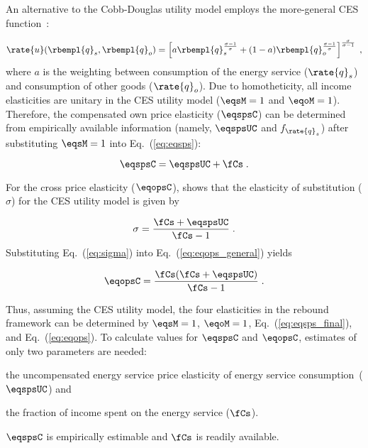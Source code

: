 An alternative to the Cobb-Douglas utility model employs 
the more-general CES function~\citep{Lemoine:2020aa}:

\begin{equation}
  \rate{u}(\rbempl{q}_s,\rbempl{q}_o) = 
      \left[ a \rbempl{q}_s^{\frac{\sigma-1}{\sigma}} 
            + (1-a) \rbempl{q}_o^{\frac{\sigma-1}{\sigma}} \right]                
                                   ^{\frac{\sigma}{\sigma-1}} \; ,
\end{equation}
%
where $a$ is the weighting between
consumption of the energy service ($\rate{q}_s$)
and consumption of other goods ($\rate{q}_o$).
Due to homotheticity,
all income elasticities are unitary in the CES utility model
($\eqsM = 1$ and $\eqoM = 1$).
Therefore,
the compensated own price elasticity ($\eqspsC$) can be
determined from empirically available information
(namely, $\eqspsUC$ and $f_{\rate{q}_s}$)
after substituting $\eqsM = 1$ into Eq.~(\ref{eq:eqsps}):

\begin{equation} \label{eq:eqsps_final}
  \eqspsC = \eqspsUC + \fCs \; .
\end{equation}

For the cross price elasticity ($\eqopsC$),
\citet{Gortz1977} shows that
the elasticity of substitution ($\sigma$)
for the CES utility model is given by

\begin{equation} \label{eq:sigma}
  \sigma  = \frac{\fCs + \eqspsUC}{\fCs - 1} \; . 
\end{equation}
%
Substituting Eq.~(\ref{eq:sigma}) into Eq.~(\ref{eq:eqops_general}) yields

\begin{equation} \label{eq:eqops}
  \eqopsC = \frac{\fCs (\fCs + \eqspsUC)}{\fCs - 1} \; .
\end{equation}

Thus, assuming the CES utility model,
the four elasticities in the rebound framework can be determined by
$\eqsM = 1$,
$\eqoM = 1$,
Eq.~(\ref{eq:eqsps_final}), and
Eq.~(\ref{eq:eqops}).
To calculate values for $\eqspsC$ and $\eqopsC$, 
estimates of only two parameters are needed:
%
\begin{enumerate*}[label={(\alph*)}]

  \item the uncompensated energy service price elasticity of energy service consumption~($\eqspsUC$) and

  \item the fraction of income spent on the energy service ($\fCs$).

\end{enumerate*}
%
$\eqspsC$ is empirically estimable and $\fCs$ is readily available.
